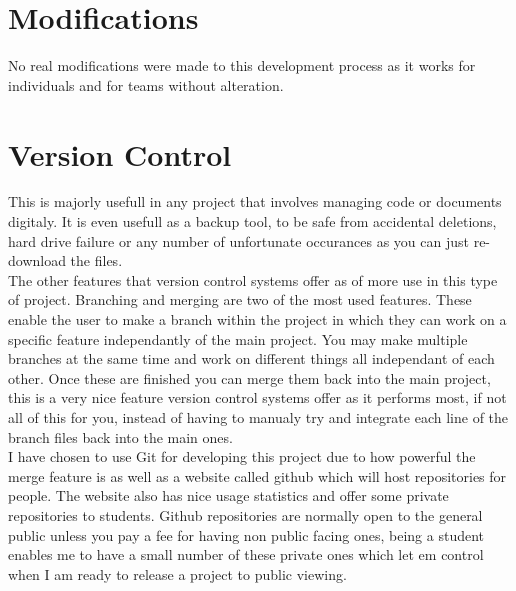 \section{Modifications}
No real modifications were made to this development process as it works for individuals and for teams without alteration.

\section{Version Control}
This is majorly usefull in any project that involves managing code or documents digitaly.  It is even usefull as a backup tool, to be safe from accidental deletions, hard drive failure or any number of unfortunate occurances as you can just re-download the files.
\\The other features that version control systems offer as of more use in this type of project.  Branching and merging are two of the most used features.  These enable the user to make a branch within the project in which they can work on a specific feature independantly of the main project.  You may make multiple branches at the same time and work on different things all independant of each other.  Once these are finished you can merge them back into the main project, this is a very nice feature version control systems offer as it performs most, if not all of this for you, instead of having to manualy try and integrate each line of the branch files back into the main ones.
\\I have chosen to use Git for developing this project due to how powerful the merge feature is as well as a website called github \cite{github} which will host repositories for people.  The website also has nice usage statistics and offer some private repositories to students.  Github repositories are normally open to the general public unless you pay a fee for having non public facing ones, being a student enables me to have a small number of these private ones which let em control when I am ready to release a project to public viewing.

